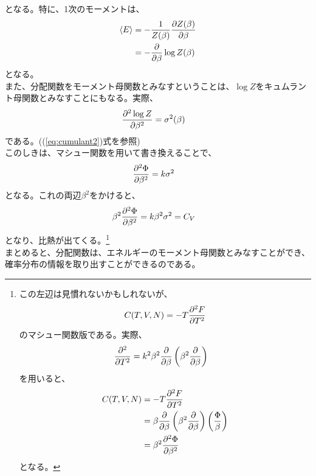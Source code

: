 \documentclass[a4paper,11pt]{jsarticle}
\numberwithin{equation}{section}
\begin{document}
となる。特に、1次のモーメントは、
\begin{align}
  \expval{E} &= -\frac{1}{Z(\beta)}\pdv{Z(\beta)}{\beta}\\
  &= -\pdv{\beta}\log Z(\beta)
\end{align}
となる。\\
また、分配関数をモーメント母関数とみなすということは、$\log Z$をキュムラント母関数とみなすことにもなる。実際、
\begin{align}
  \pdv[2]{\log Z}{\beta} &= \sigma^2(\beta)
\end{align}
である。((\ref{eq:cumulant2})式を参照)\\
このしきは、マシュー関数を用いて書き換えることで、
\begin{align}
  \pdv[2] {\Phi}{\beta} &= k\sigma^2
\end{align}
となる。これの両辺$\beta^2$をかけると、
\begin{align}
  \beta^2\pdv[2] {\Phi}{\beta} &= k\beta^2\sigma^2 =C_{V}
\end{align}
となり、比熱が出てくる。\footnote{この左辺は見慣れないかもしれないが、
\begin{align}
  C(T,V,N) = -T\pdv[2]{F}{T}
\end{align}
のマシュー関数版である。実際、
\begin{align}
  \pdv[2]{T} &= k^2\beta^2\pdv{\beta}\left(\beta^2 \pdv{\beta}\right)
\end{align}
を用いると、
\begin{align}
  C(T,V,N) &= -T\pdv[2]{F}{T}\\
  &=\beta\pdv{\beta}\left(\beta^2\pdv{\beta}\right)\left(\frac{\Phi}{\beta}\right)\\
  &=\beta^2\pdv[2]{\Phi}{\beta}
\end{align}
となる。}\\

まとめると、分配関数は、エネルギーのモーメント母関数とみなすことができ、確率分布の情報を取り出すことができるのである。\\ 
\end{document}
